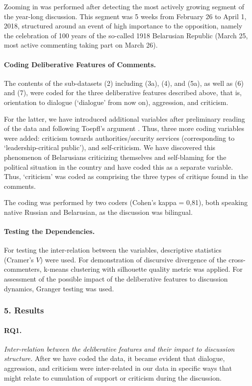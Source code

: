 Zooming in was performed after detecting the most actively growing segment of the year-long discussion. This segment was 5 weeks from February 26 to April 1, 2018, structured around an event of high importance to the opposition, namely the celebration of 100 years of the so-called 1918 Belarusian Republic (March 25, most active commenting taking part on March 26).

\paragraph{Coding Deliberative Features of Comments.} The contents of the sub-datasets (2) including (3a), (4), and (5a), as well as (6) and (7), were coded for the three deliberative features described above, that is, orientation to dialogue (‘dialogue’ from now on), aggression, and criticism.

For the latter, we have introduced additional variables after preliminary reading of the data and following Toepfl’s argument \cite{Toepfl}. Thus, three more coding variables were added: criticism towards authorities/security services (corresponding to ‘leadership-critical public’), and self-criticism. We have discovered this phenomenon of Belarusians criticizing themselves and self-blaming for the political situation in the country and have coded this as a separate variable. Thus, ‘criticism’ was coded as comprising the three types of critique found in the comments.

The coding was performed by two coders (Cohen’s kappa = 0,81), both speaking native Russian and Belarusian, as the discussion was bilingual.

\paragraph{Testing the Dependencies.} For testing the inter-relation between the variables, descriptive statistics (Cramer’s \(V\)) were used. For demonstration of discursive divergence of the cross-commenters, k-means clustering with silhouette quality metric was applied. For assessment of the possible impact of the deliberative features to discussion dynamics, Granger testing was used.

\subsubsection{5. Results}

\paragraph{RQ1.} \textit{Inter-relation between the deliberative features and their impact to discussion structure.} After we have coded the data, it became evident that dialogue, aggression, and criticism were inter-related in our data in specific ways that might relate to cumulation of support or criticism during the discussion.

